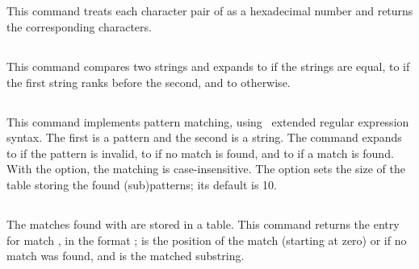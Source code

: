 \documentclass{pdftexmanual}
\begin{document}
\subsection{}

This command treats each character pair of  as
a hexadecimal number and returns the corresponding characters.

\subsection{}

This command compares two strings and expands to  if the strings
are equal, to  if the first string ranks before the second, and
to  otherwise.  

\subsection{}

This command implements pattern matching, using \POSIX\ extended regular
expression syntax. The first  is a pattern and
the second is a string. The command expands to  if the pattern
is invalid, to  if no match is found, and to  if a match
is found. With the  option, the matching is
case-insensitive. The  option sets the size of the table
storing the found (sub)patterns; its default is 10. 

\subsection{}

The matches found with  are stored in a table. This command
returns the entry for match , in the format
\type{->};  is
the position of the match (starting at zero) or  if no match
was found, and  is the matched substring.
\end{document}
